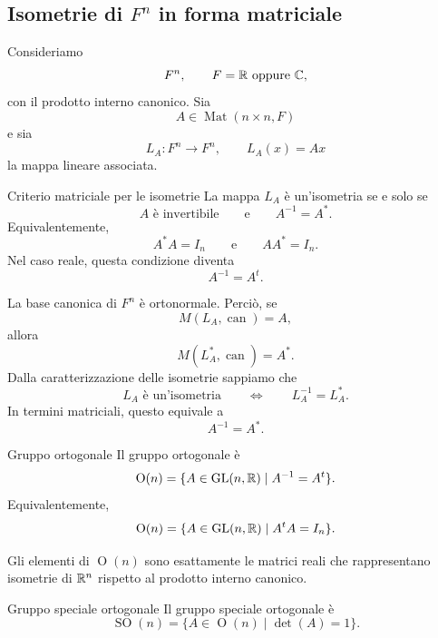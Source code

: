 \documentclass[a4paper]{article}
\begin{document}
\subsection{Isometrie di \(F^n\) in forma matriciale}

Consideriamo
\[
    F^n,
    \qquad
    F=\mathbb{R} \text{ oppure } \mathbb{C},
\]
con il prodotto interno canonico. Sia
\[
    A\in\operatorname{Mat}(n\times n,F)
\]
e sia
\[
    L_A:F^n\to F^n,
    \qquad
    L_A(x)=Ax
\]
la mappa lineare associata.

\begin{snippetproposition}{Criterio matriciale per le isometrie}
    La mappa \(L_A\) è un'isometria se e solo se
    \[
        A \text{ è invertibile}
        \qquad
        \text{e}
        \qquad
        A^{-1}=A^*.
    \]
    Equivalentemente,
    \[
        A^*A=I_n
        \qquad
        \text{e}
        \qquad
        AA^*=I_n.
    \]
    Nel caso reale, questa condizione diventa
    \[
        A^{-1}=A^t.
    \]
\end{snippetproposition}

\begin{snippetproof}{}
    La base canonica di \(F^n\) è ortonormale. Perciò, se
    \[
        M(L_A,\operatorname{can})=A,
    \]
    allora
    \[
        M(L_A^*,\operatorname{can})=A^*.
    \]
    Dalla caratterizzazione delle isometrie sappiamo che
    \[
        L_A \text{ è un'isometria}
        \qquad
        \Longleftrightarrow
        \qquad
        L_A^{-1}=L_A^*.
    \]
    In termini matriciali, questo equivale a
    \[
        A^{-1}=A^*.
    \]
\end{snippetproof}

\begin{snippetdefinition}{Gruppo ortogonale}
    Il gruppo ortogonale è
    \[
        \operatorname{O}(n)
        =
        \{A\in\operatorname{GL}(n,\mathbb{R})\mid A^{-1}=A^t\}.
    \]
    Equivalentemente,
    \[
        \operatorname{O}(n)
        =
        \{A\in\operatorname{GL}(n,\mathbb{R})\mid A^tA=I_n\}.
    \]
\end{snippetdefinition}

Gli elementi di \(\operatorname{O}(n)\) sono esattamente le matrici reali che rappresentano isometrie di \(\mathbb{R}^n\) rispetto al prodotto interno canonico.

\begin{snippetdefinition}{Gruppo speciale ortogonale}
    Il gruppo speciale ortogonale è
    \[
        \operatorname{SO}(n)
        =
        \{A\in\operatorname{O}(n)\mid \det(A)=1\}.
    \]
\end{snippetdefinition}
\end{document}
